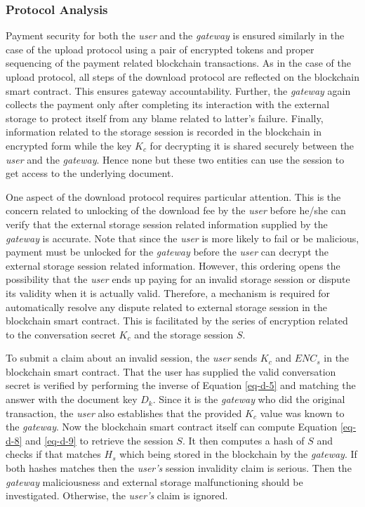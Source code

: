 \documentclass[conference]{IEEEtran}
\begin{document}
\subsubsection*{Protocol Analysis}
Payment security for both the {\it user} and the {\it gateway} is ensured similarly in the case of the upload protocol using a pair of encrypted tokens and proper sequencing of the payment related blockchain transactions. As in the case of the upload protocol, all steps of the download protocol are reflected on the blockchain smart contract. This ensures gateway accountability. Further, the {\it gateway} again collects the payment only after completing its interaction with the external storage to protect itself from any blame related to latter's failure. Finally, information related to the storage session  is recorded in the blockchain in encrypted form while the key $K_c$ for decrypting it is shared securely between the {\it user} and the {\it gateway}. Hence none but these two entities can use the session to get access to the underlying document.

One aspect of the download protocol requires particular attention. This is the concern related to unlocking of the download fee by the {\it user} before he/she can verify that the external storage session related information supplied by the {\it gateway} is accurate. Note that since the {\it user} is more likely to fail or be malicious, payment must be unlocked for the {\it gateway} before the {\it user} can decrypt the external storage session related information. However, this ordering opens the possibility that the {\it user} ends up paying for an invalid storage session or dispute its validity when it is actually valid. Therefore, a mechanism is required for automatically resolve any dispute related to external storage session in the blockchain smart contract. This is facilitated by the series of encryption related to the conversation secret $K_c$ and the storage session $S$.

To submit a claim about an invalid session, the {\it user} sends $K_c$ and $ENC_s$ in the blockchain smart contract. That the user has supplied the valid conversation secret is verified by performing the inverse of Equation \ref{eq-d-5} and matching the answer with the document key $D_k$. Since it is the {\it gateway} who did the original transaction, the {\it user} also establishes that the provided $K_c$ value was known to the {\it gateway}. Now the blockchain smart contract itself can compute Equation \ref{eq-d-8} and \ref{eq-d-9} to retrieve the session $S$. It then computes a hash of $S$ and checks if that matches $H_s$ which being stored in the blockchain by the {\it gateway}. If both hashes matches then the {\it user's} session invalidity claim is serious. Then the {\it gateway} maliciousness and external storage  malfunctioning should be investigated. Otherwise, the {\it user's} claim is ignored.          
\end{document}
